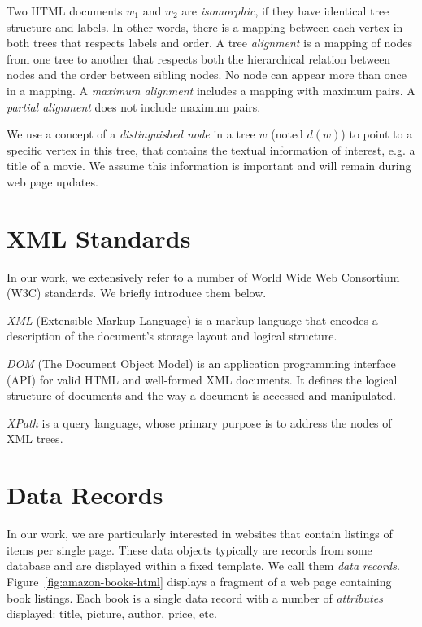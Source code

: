 Two HTML documents $w_1$ and $w_2$ are \emph{isomorphic}, if they have identical tree structure and labels. In other words, there is a mapping between each vertex in both trees that respects labels and order. A tree \emph{alignment} is a mapping of nodes from one tree to another that respects both the hierarchical relation between nodes and the order between sibling nodes. No node can appear more than once in a mapping. A \emph{maximum alignment} includes a mapping with maximum pairs. A \emph{partial alignment} does not include maximum pairs.

We use a concept of a \emph{distinguished node} in a tree $w$ (noted $d(w)$) to point to a specific vertex in this tree, that contains the textual information of interest, e.g. a title of a movie. We assume this information is important and will remain during web page updates.


\section{XML Standards}

In our work, we extensively refer to a number of World Wide Web Consortium (W3C) standards. We briefly introduce them below.

\emph{XML} (Extensible Markup Language) is a markup language that encodes a description of the document's storage layout and logical structure. \cite{w3c:xml}

\emph{DOM} (The Document Object Model) is an application programming interface (API) for valid HTML and well-formed XML documents. It defines the logical structure of documents and the way a document is accessed and manipulated. \cite{w3c:dom}

\emph{XPath} is a query language, whose primary purpose is to address the nodes of XML trees. \cite{w3c:xpath}


\section{Data Records}

In our work, we are particularly interested in websites that contain listings of items per single page. These data objects typically are records from some database and are displayed within a fixed template. We call them \emph{data records}. Figure~\ref{fig:amazon-books-html} displays a fragment of a web page containing book listings. Each book is a single data record with a number of \emph{attributes} displayed: title, picture, author, price, etc.

